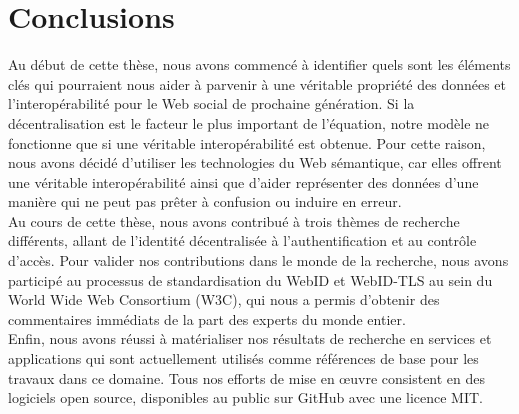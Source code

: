 \documentclass[a4paper]{article}
\begin{document}
\section{Conclusions}
Au début de cette thèse, nous avons commencé à identifier quels sont les éléments clés qui pourraient nous aider à parvenir à une véritable propriété des données et l'interopérabilité pour le Web social de prochaine génération. Si la décentralisation est le facteur le plus important de l'équation, notre modèle ne fonctionne que si une véritable interopérabilité est obtenue. Pour cette raison, nous avons décidé d'utiliser les technologies du Web sémantique, car elles offrent une véritable interopérabilité ainsi que d'aider représenter des données d'une manière qui ne peut pas prêter à confusion ou induire en erreur.\\


Au cours de cette thèse, nous avons contribué à trois thèmes de recherche différents, allant de l'identité décentralisée  à l'authentification et au contrôle d'accès. Pour valider nos contributions dans le monde de la recherche, nous avons participé au processus de standardisation du WebID et WebID-TLS au sein du World Wide Web Consortium (W3C), qui nous a permis d'obtenir des commentaires immédiats de la part des experts du monde entier.\\


Enfin, nous avons réussi à matérialiser nos résultats de recherche en services et applications qui sont actuellement utilisés comme références de base pour les travaux dans ce domaine. Tous nos efforts de mise en œuvre consistent en des logiciels open source, disponibles au public sur GitHub avec une licence MIT.


\newpage



\end{document}
